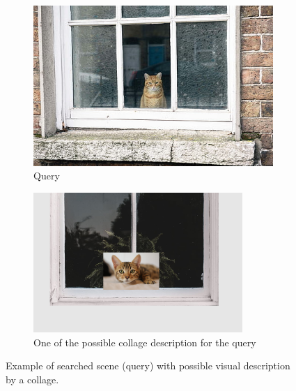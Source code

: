 \begin{figure}
\centering

\begin{subfigure}[t]{0.45\textwidth}
\includegraphics[width=0.9\linewidth]{img/cat_on_window} 
\caption{Query}
\label{fig:searched_scene}
\end{subfigure}
\begin{subfigure}[t]{0.45\textwidth}
\includegraphics[width=0.9\linewidth]{img/cat_on_window_collage}
\caption{One of the possible collage description for the query}
\label{fig:collage_example}
\end{subfigure}

\caption{Example of searched scene (query) with possible visual description by a collage.}
\label{fig:query_collage_comparison}
\end{figure}

